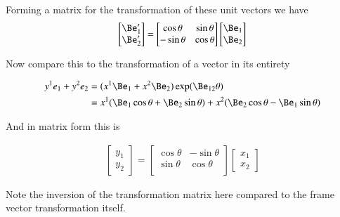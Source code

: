 \documentclass{article}
\begin{document}
Forming a matrix for the transformation of these unit vectors we have
\begin{align*}
\begin{bmatrix}
\Be_1' \\
\Be_2'
\end{bmatrix}
=
\begin{bmatrix}
\cos\theta & \sin\theta \\
- \sin\theta & \cos\theta \\
\end{bmatrix}
\begin{bmatrix}
\Be_1 \\
\Be_2
\end{bmatrix}
\end{align*}

Now compare this to the transformation of a vector in its entirety

\begin{align*}
y^1 e_1 + y^2 e_2 
&= ( x^1 \Be_1 + x^2 \Be_2 ) \exp(\Be_{12}\theta) \\
&= x^1(\Be_1 \cos\theta + \Be_2 \sin\theta) 
 + x^2(\Be_2 \cos\theta - \Be_1 \sin\theta) \\
\end{align*}

And in matrix form this is

\begin{align*}
\begin{bmatrix}
y_1 \\
y_2
\end{bmatrix}
=
\begin{bmatrix}
\cos\theta & -\sin\theta \\
\sin\theta & \cos\theta \\
\end{bmatrix}
\begin{bmatrix}
x_1 \\
x_2
\end{bmatrix}
\end{align*}

Note the inversion of the transformation matrix here compared to the frame vector transformation itself.
\end{document}
